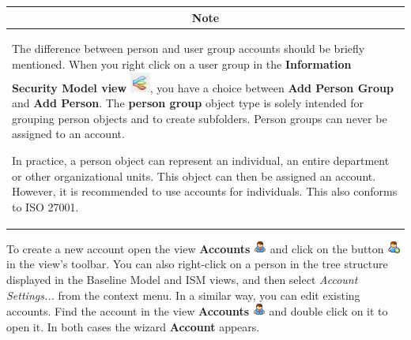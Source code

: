 \documentclass[a4paper,10pt]{book}
\begin{document}
\begin{longtable}{| p{} |}
\hline
\multicolumn{1}{|c|}{\textbf{Note}} \\
\hline\hline
The difference between person and user group accounts should be briefly mentioned. When you right click on a user group in the \textbf{Information Security Model view} \includegraphics[height=2ex]{Icon/Informationssicherheitsmodell.png}, you have a choice between \textbf{Add Person Group} and \textbf{Add Person}. The \textbf{person group} object type is solely intended for grouping person objects and to create subfolders. Person groups can never be assigned to an account.

In practice, a person object can represent an individual, an entire department or other organizational units. This object can then be assigned an account. However, it is recommended to use accounts for individuals. This also conforms to ISO 27001. \\[10pt] \hline
\end{longtable}

To create a new account open the view \textbf{Accounts} \includegraphics[height=2ex]{Icon/Mitarbeiter.png} and click on the button \includegraphics[height=2ex]{Icon/user_add.png} in the view’s toolbar. You can also right-click on a person in the tree structure displayed in the Baseline Model and ISM views, and then select \textit{Account Settings...} from the context menu. In a similar way, you can edit existing accounts. Find the account in the view \textbf{Accounts} \includegraphics[height=2ex]{Icon/Mitarbeiter.png} and double click on it to open it. In both cases the wizard \textbf{Account} appears.
\end{document}
